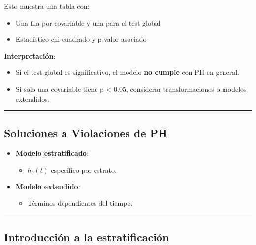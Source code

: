 \documentclass[
]{article}
\providecommand{\tightlist}{%
  \setlength{\itemsep}{0pt}\setlength{\parskip}{0pt}}\usepackage{longtable,booktabs,array}
\begin{document}
Esto muestra una tabla con:

\begin{itemize}
\tightlist
\item
  Una fila por covariable y una para el test global
\item
  Estadístico chi-cuadrado y p-valor asociado
\end{itemize}

\textbf{Interpretación}:

\begin{itemize}
\tightlist
\item
  Si el test global es significativo, el modelo \textbf{no cumple} con
  PH en general.
\item
  Si solo una covariable tiene p \textless{} 0.05, considerar
  transformaciones o modelos extendidos.
\end{itemize}

\begin{center}\rule{0.5\linewidth}{0.5pt}\end{center}

\subsection{Soluciones a Violaciones de
PH}\label{soluciones-a-violaciones-de-ph}

\begin{itemize}
\tightlist
\item
  \textbf{Modelo estratificado}:

  \begin{itemize}
  \tightlist
  \item
    \(h_0(t)\) específico por estrato.
  \end{itemize}
\item
  \textbf{Modelo extendido}:

  \begin{itemize}
  \tightlist
  \item
    Términos dependientes del tiempo.
  \end{itemize}
\end{itemize}

\begin{center}\rule{0.5\linewidth}{0.5pt}\end{center}

\subsection{Introducción a la
estratificación}\label{introducciuxf3n-a-la-estratificaciuxf3n}
\end{document}
